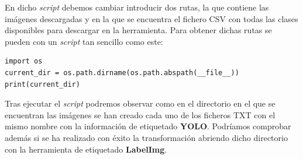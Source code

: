 En dicho \textit{script} debemos cambiar introducir dos rutas, la que contiene las imágenes descargadas y en la que se encuentra el fichero CSV con todas las clases disponibles para descargar en la herramienta. Para obtener dichas rutas se pueden con un \textit{script} tan sencillo como este:

\begin{lstlisting}
import os
current_dir = os.path.dirname(os.path.abspath(__file__))
print(current_dir)
\end{lstlisting}

Tras ejecutar el \textit{script} podremos observar como en el directorio en el que se encuentran las imágenes se han creado cada uno de los ficheros TXT con el mismo nombre con la información de etiquetado \textbf{YOLO}. Podríamos comprobar además si se ha realizado con éxito la transformación abriendo dicho directorio con la herramienta de etiquetado \textbf{LabelImg}.
